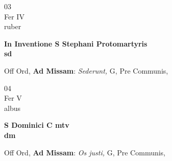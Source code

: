 \documentclass[10pt, openany]{book}
\begin{document}
        \begin{center}
            \begin{minipage}{3.5in}
                \vspace{2em}
                \begin{minipage}{0.5in}
                    {\Huge 03} \\
                    {\normalsize Fer IV} \\
                    {\normalsize ruber}
                \end{minipage}
                \begin{minipage}{3.0in}
                    \textbf{ \large In Inventione S Stephani Protomartyris \\
                    \textnormal{\normalsize sd}} \\ 
                \end{minipage}
                \begin{justify}Off Ord, \textbf{Ad Missam}: \textit{Sederunt,} G, Pre Communis,  
                \end{justify}
            \end{minipage}
        \end{center}
    
        \begin{center}
            \begin{minipage}{3.5in}
                \vspace{2em}
                \begin{minipage}{0.5in}
                    {\Huge 04} \\
                    {\normalsize Fer V} \\
                    {\normalsize albus}
                \end{minipage}
                \begin{minipage}{3.0in}
                    \textbf{ \large S Dominici C mtv \\
                    \textnormal{\normalsize dm}} \\ 
                \end{minipage}
                \begin{justify}Off Ord, \textbf{Ad Missam}: \textit{Os justi,} G, Pre Communis,  
                \end{justify}
            \end{minipage}
        \end{center}
    
\end{document}
